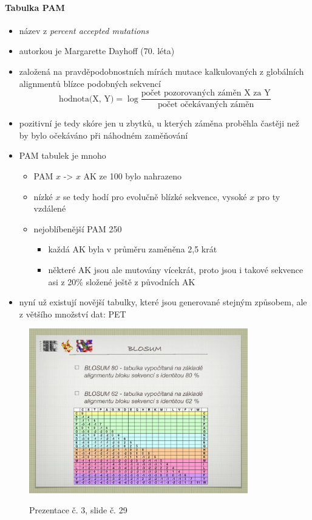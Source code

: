 \documentclass[DIV=8]{scrreprt}
\begin{document}
\paragraph{Tabulka PAM}
\begin{itemize}[nosep]
    \item název z \emph{percent accepted mutations}
    \item autorkou je Margarette Dayhoff (70. léta)
    \item založená na pravděpodobnostních mírách mutace kalkulovaných z globálních alignmentů blízce podobných sekvencí
\[\text{hodnota(X, Y)} = \log \frac{\text{počet pozorovaných záměn X za Y}}{\text{počet očekávaných záměn}}\]
    \item pozitivní je tedy skóre jen u zbytků, u kterých záměna proběhla častěji než by bylo očekáváno při náhodném zaměňování
    \item PAM tabulek je mnoho
\begin{itemize}[nosep]
    \item PAM \(x\) -> \(x\) AK ze 100 bylo nahrazeno
    \item nízké \(x\) se tedy hodí pro evolučně blízké sekvence, vysoké \(x\) pro ty vzdálené
    \item nejoblíbenější PAM 250
\begin{itemize}[nosep]
    \item každá AK byla v průměru zaměněna 2,5 krát
    \item některé AK jsou ale mutovány vícekrát, proto jsou i takové sekvence asi z 20\% složené ještě z původních AK
\end{itemize}

\end{itemize}

    \item nyní už existují novější tabulky, které jsou generované stejným způsobem, ale z většího množství dat: PET
\end{itemize}



\begin{figure}
    \caption{Prezentace č. 3, slide č. 29}
    \includegraphics[width=0.85\textwidth]{slides-3/slide-29.jpg}
    \centering
    \label{slides-3-slide-29}
\end{figure}
\end{document}
